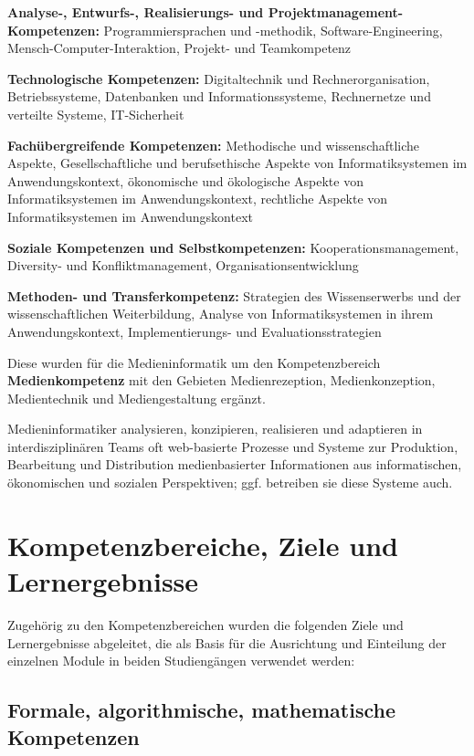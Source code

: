 \textbf{Analyse-, Entwurfs-, Realisierungs- und
Projektmanagement-Kompetenzen:} Programmiersprachen und -methodik,
Software-Engineering, Mensch-Computer-Interaktion, Projekt- und
Teamkompetenz

\textbf{Technologische Kompetenzen:} Digitaltechnik und
Rechnerorganisation, Betriebssysteme, Datenbanken und
Informationssysteme, Rechnernetze und verteilte Systeme, IT-Sicherheit

\textbf{Fachübergreifende Kompetenzen:} Methodische und
wissenschaftliche Aspekte, Gesellschaftliche und berufsethische Aspekte
von Informatiksystemen im Anwendungskontext, ökonomische und ökologische
Aspekte von Informatiksystemen im Anwendungskontext, rechtliche Aspekte
von Informatiksystemen im Anwendungskontext

\textbf{Soziale Kompetenzen und Selbstkompetenzen:}
Kooperationsmanagement, Diversity- und Konfliktmanagement,
Organisationsentwicklung

\textbf{Methoden- und Transferkompetenz:} Strategien des Wissenserwerbs
und der wissenschaftlichen Weiterbildung, Analyse von Informatiksystemen
in ihrem Anwendungskontext, Implementierungs- und Evaluationsstrategien

Diese wurden für die Medieninformatik um den Kompetenzbereich
\textbf{Medienkompetenz} mit den Gebieten Medienrezeption,
Medienkonzeption, Medientechnik und Mediengestaltung ergänzt.

Medieninformatiker analysieren, konzipieren, realisieren und adaptieren
in interdisziplinären Teams oft web-basierte Prozesse und Systeme zur
Produktion, Bearbeitung und Distribution medienbasierter Informationen
aus informatischen, ökonomischen und sozialen Perspektiven; ggf.
betreiben sie diese Systeme auch.

\section{Kompetenzbereiche, Ziele und
Lernergebnisse\label{/mi-2017/selbstbericht/0200-qualifikationsziele/0000-qualifikationsziele}}\label{kompetenzbereiche-ziele-und-lernergebnissepathlabelmi-2017selbstbericht0200-qualifikationsziele0000-qualifikationsziele}

Zugehörig zu den Kompetenzbereichen wurden die folgenden Ziele und
Lernergebnisse abgeleitet, die als Basis für die Ausrichtung und
Einteilung der einzelnen Module in beiden Studiengängen verwendet
werden:

\subsection{Formale, algorithmische, mathematische
Kompetenzen\label{/mi-2017/selbstbericht/0200-qualifikationsziele/0000-qualifikationsziele}}\label{formale-algorithmische-mathematische-kompetenzenpathlabelmi-2017selbstbericht0200-qualifikationsziele0000-qualifikationsziele}

